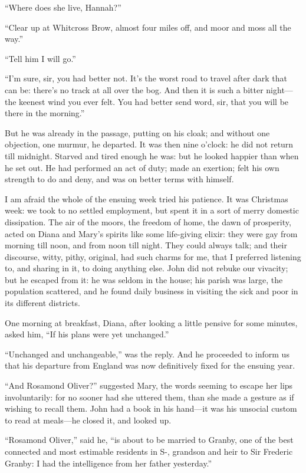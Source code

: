 \enquote{Where does she live, Hannah?}

\enquote{Clear up at Whitcross Brow, almost four miles off, and moor and
moss all the way.}

\enquote{Tell him I will go.}

\enquote{I'm sure, sir, you had better not. It's the worst road to
travel after dark that can be: there's no track at all over the bog. 
And then it is such a bitter night---the keenest wind you ever felt. 
You had better send word, sir, that you will be there in the morning.}

But he was already in the passage, putting on his cloak; and without one
objection, one murmur, he departed. It was then nine o'clock: he did
not return till midnight. Starved and tired enough he was: but he
looked happier than when he set out. He had performed an act of duty;
made an exertion; felt his own strength to do and deny, and was on
better terms with himself.

I am afraid the whole of the ensuing week tried his patience. It was
Christmas week: we took to no settled employment, but spent it in a sort
of merry domestic dissipation. The air of the moors, the freedom of
home, the dawn of prosperity, acted on Diana and Mary's spirits like
some life-giving elixir: they were gay from morning till noon, and from
noon till night. They could always talk; and their discourse, witty,
pithy, original, had such charms for me, that I preferred listening to,
and sharing in it, to doing anything else. \St{} John did not rebuke our
vivacity; but he escaped from it: he was seldom in the house; his parish
was large, the population scattered, and he found daily business in
visiting the sick and poor in its different districts.

One morning at breakfast, Diana, after looking a little pensive for some
minutes, asked him, \enquote{If his plans were yet unchanged.}

\enquote{Unchanged and unchangeable,} was the reply. And he proceeded
to inform us that his departure from England was now definitively fixed
for the ensuing year.

\enquote{And Rosamond Oliver?} suggested Mary, the words seeming to
escape her lips involuntarily: for no sooner had she uttered them, than
she made a gesture as if wishing to recall them. \St{} John had a book in
his hand---it was his unsocial custom to read at meals---he closed it,
and looked up.

\enquote{Rosamond Oliver,} said he, \enquote{is about to be married to
\Mr{} Granby, one of the best connected and most estimable residents in
S-, grandson and heir to Sir Frederic Granby: I had the intelligence
from her father yesterday.}

